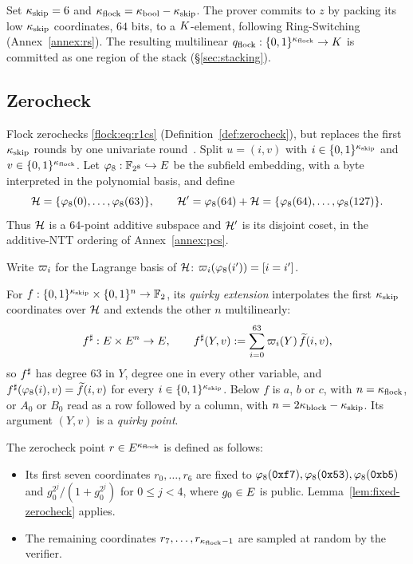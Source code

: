 Set $\kappa_{\mathrm{skip}}=6$ and $\kappa_{\mathrm{flock}}=\kappa_{\mathrm{bool}}-\kappa_{\mathrm{skip}}$. The prover commits to $z$ by packing its low $\kappa_{\mathrm{skip}}$ coordinates, $64$ bits, to a $K$-element, following Ring-Switching (Annex~\ref{annex:rs}). The resulting multilinear $q_{\mathrm{flock}}:\{0,1\}^{\kappa_{\mathrm{flock}}}\to K$ is committed as one region of the stack (\S\ref{sec:stacking}).


\subsection{Zerocheck}\label{flock:zerocheck}

Flock zerochecks \eqref{flock:eq:r1cs} (Definition~\ref{def:zerocheck}), but replaces the first $\kappa_{\mathrm{skip}}$ rounds by one univariate round~\cite{Gru24}. Split $u=(i,v)$ with $i\in\{0,1\}^{\kappa_{\mathrm{skip}}}$ and $v\in\{0,1\}^{\kappa_{\mathrm{flock}}}$. Let $\varphi_{8}:\mathbb{F}_{2^8}\hookrightarrow E$ be the subfield embedding, with a byte interpreted in the polynomial basis, and define
\[
\mathcal{H}=\{\varphi_{8}(0),\ldots,\varphi_{8}(63)\},\qquad \mathcal{H}'=\varphi_{8}(64)+\mathcal{H}=\{\varphi_{8}(64),\ldots,\varphi_{8}(127)\}.
\]
Thus $\mathcal{H}$ is a $64$-point additive subspace and $\mathcal{H}'$ is its disjoint coset, in the additive-NTT ordering of Annex~\ref{annex:pcs}.

Write $\varpi_i$ for the Lagrange basis of $\mathcal{H}$: $\varpi_i(\varphi_{8}(i'))=[i=i']$.

\begin{definition}\label{def:quirky}
For $f:\{0,1\}^{\kappa_{\mathrm{skip}}}\times\{0,1\}^{n}\to\mathbb{F}_2$, its \emph{quirky extension} interpolates the first $\kappa_{\mathrm{skip}}$ coordinates over $\mathcal{H}$ and extends the other $n$ multilinearly:
\[
  f^{\sharp}:E\times E^{n}\to E,\qquad
  f^{\sharp}(Y,v):=\sum_{i=0}^{63}\varpi_i(Y)\,\widetilde{f}(i,v),
\]
so $f^{\sharp}$ has degree $63$ in $Y$, degree one in every other variable, and $f^{\sharp}(\varphi_{8}(i),v)=\widetilde{f}(i,v)$ for every $i\in\{0,1\}^{\kappa_{\mathrm{skip}}}$. Below $f$ is $a$, $b$ or $c$, with $n=\kappa_{\mathrm{flock}}$, or $A_0$ or $B_0$ read as a row followed by a column, with $n=2\kappa_{\mathrm{block}}-\kappa_{\mathrm{skip}}$. Its argument $(Y,v)$ is a \emph{quirky point}.
\end{definition}

The zerocheck point $r \in E^{\kappa_{\mathrm{flock}}}$ is defined as follows:
\begin{itemize}
  \item Its first seven coordinates $r_0, \dots, r_6$ are fixed to $\varphi_{8}(\mathtt{0xf7}),\varphi_{8}(\mathtt{0x53}),\varphi_{8}(\mathtt{0xb5})$ and $g_0^{2^j}/(1+g_0^{2^j})$ for $0\leq j<4$, where $g_0\in E$ is public. Lemma~\ref{lem:fixed-zerocheck} applies.
  \item The remaining coordinates $r_7,\dots,r_{\kappa_{\mathrm{flock}}-1}$ are sampled at random by the verifier.
\end{itemize}

